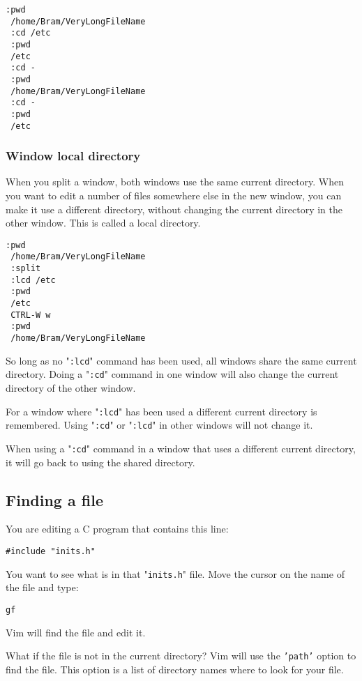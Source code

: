\begin{Verbatim}[samepage=true]
 :pwd
 /home/Bram/VeryLongFileName
 :cd /etc
 :pwd
 /etc
 :cd -
 :pwd
 /home/Bram/VeryLongFileName
 :cd -
 :pwd
 /etc
\end{Verbatim}

\subsubsection{Window local directory}
When you split a window, both windows use the same current directory.
When you want to edit a number of files somewhere else in the new window, you can make it use a different directory, without changing the current directory in the other window.
This is called a local directory.

\begin{Verbatim}[samepage=true]
 :pwd
 /home/Bram/VeryLongFileName
 :split
 :lcd /etc
 :pwd
 /etc
 CTRL-W w
 :pwd
 /home/Bram/VeryLongFileName
\end{Verbatim}

So long as no "\texttt{:lcd}" command has been used, all windows share the same current directory.
Doing a "\texttt{:cd}" command in one window will also change the current directory of the other window.

For a window where "\texttt{:lcd}" has been used a different current directory is remembered.
Using "\texttt{:cd}" or "\texttt{:lcd}" in other windows will not change it.

When using a "\texttt{:cd}" command in a window that uses a different current directory, it will go back to using the shared directory.
\subsection{Finding a file}
You are editing a C program that contains this line:

\begin{Verbatim}[samepage=true]
    #include "inits.h" 
\end{Verbatim}

You want to see what is in that "\texttt{inits.h}" file.
Move the cursor on the name of the file and type:

\begin{Verbatim}[samepage=true]
 gf
\end{Verbatim}

Vim will find the file and edit it.

What if the file is not in the current directory?  Vim will use the \texttt{'path'} option to find the file.
This option is a list of directory names where to look for your file.

